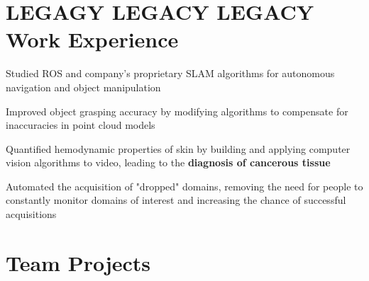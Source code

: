 \documentclass[]{deedy-resume-openfont}
\begin{document}
\begin{minipage}[t]{0.66\textwidth} 


\section{LEGAGY LEGACY LEGACY Work Experience}

\vspace{\topsep} %
\begin{tightemize}
\item Studied ROS and company’s proprietary SLAM algorithms for autonomous navigation and object manipulation
\item Improved object grasping accuracy by modifying algorithms to compensate for inaccuracies in point cloud models
\end{tightemize}
\sectionsep

\begin{tightemize}
\item Quantified hemodynamic properties of skin by building and applying computer vision algorithms to video, leading to the \textbf{diagnosis of cancerous tissue}
\end{tightemize}
\sectionsep

\begin{tightemize}
\item Automated the acquisition of "dropped" domains, removing the need for people to constantly monitor domains of interest and increasing the chance of successful acquisitions
\end{tightemize}
\sectionsep


\section{Team Projects}


\end{minipage}
\end{document}
